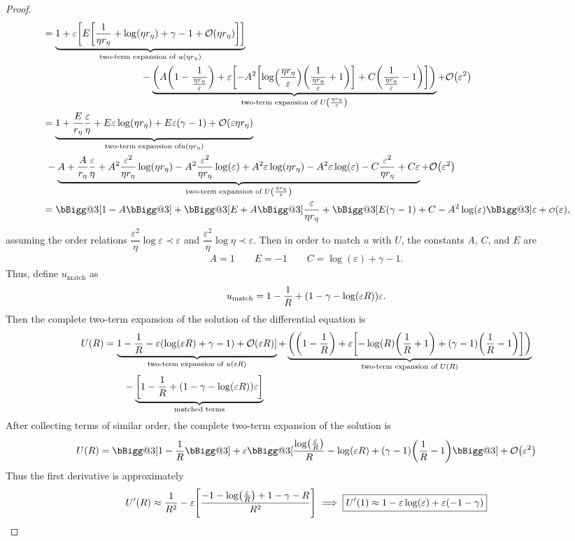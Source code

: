 \documentclass{article} %
\makeatletter
\theoremstyle{plain}
\newcommand{\BIGG}{\bBigg@{3}}
\newcommand{\E}{\varepsilon}
\newcommand{\littleo}[1]{\text{\scriptsize$\mathcal{O}$}\qty(#1)}
\numberwithin{equation}{section} %
\numberwithin{figure}{section} %
\numberwithin{table}{section} %
\makeatother
\begin{document}
\begin{proof}
\begin{align*}
        &= \underbrace{1 + \E\qty[E\qty[\frac{1}{\eta r_\eta} + \log(\eta r_\eta) + \gamma - 1 + \order{\eta r_\eta}]]}_{\text{two-term expansion of } u(\eta r_\eta)} \\
        &\qquad\qquad\qquad\qquad\qquad - \underbrace{\qty(A\qty(1 - \frac{1}{\frac{\eta r_\eta}{\E}}) + \E\qty[-A^2\qty[\log(\frac{\eta r_\eta}{\E})\qty(\dfrac{1}{\frac{\eta r_\eta}{\E}} + 1)] + C\qty(\dfrac{1}{\frac{\eta r_\eta}{\E}} - 1)])}_{\text{two-term expansion of } U\qty(\frac{\eta r_\eta}{\E})} + \order{\E^2} \\
        &= \underbrace{1 + \frac{E}{r_\eta}\frac{\E}{\eta} + E\E\log(\eta r_\eta) + E\E\qty(\gamma - 1) + \order{\E\eta r_\eta}}_{\text{two-term expansion of} u(\eta r_\eta)} \\
        &\ - \underbrace{A + \frac{A}{r_\eta}\frac{\E}{\eta} + A^2\frac{\E^2}{\eta r_\eta}\log(\eta r_\eta) - A^2\frac{\E^2}{\eta r_\eta}\log(\E) + A^2\E\log(\eta r_\eta) - A^2\E\log(\E) - C \frac{\E^2}{\eta r_\eta} + C\E}_{\text{two-term expansion of } U\qty(\frac{\eta r_\eta}{\E})} + \order{\E^2} \\
        &= \BIGG[1 - A\BIGG] + \BIGG[E + A\BIGG]\frac{\E}{\eta r_\eta} + \BIGG[E\qty(\gamma - 1) + C - A^2\log(\E)\BIGG]\E + \littleo{\E},
    \end{align*}
    assuming the order relations $\dfrac{\E^2}{\eta} \log\E \prec \E$ and $\dfrac{\E^2}{\eta} \log\eta \prec \E$.  Then in order to match $u$ with $U$, the constants $A$, $C$, and $E$ are
    \begin{align*}
        A = 1 \qquad E = -1 \qquad C = \log(\E) + \gamma - 1.
    \end{align*}
    Thus, define $u_\text{match}$ as
    \begin{align*}
        u_\text{match} = 1 - \frac{1}{R} + \qty(1 - \gamma - \log(\E R))\E.
    \end{align*}
    Then the complete two-term expansion of the solution of the differential equation is
    \begin{align*}
        U(R) &= \underbrace{1 - \frac{1}{R} - \E\qty(\log(\E R) + \gamma - 1) + \order{\E R}]}_{\text{two-term expansion of } u(\E R)} + \underbrace{\qty(\qty(1 - \frac{1}{R}) + \E\qty[-\log(R)\qty(\dfrac{1}{R} + 1) + \qty(\gamma - 1)\qty(\dfrac{1}{R} - 1)])}_{\text{two-term expansion of } U(R)} \\
        &\qquad - \underbrace{\qty[1 - \frac{1}{R} + \qty(1 - \gamma - \log(\E R))\E]}_{\text{matched terms}}
    \end{align*}
    After collecting terms of similar order, the complete two-term expansion of the solution is
    \begin{align*}
        U(R) = \BIGG[1 - \frac{1}{R}\BIGG] + \E\BIGG[\frac{\log(\frac{\E}{R})}{R} - \log(\E R) + \qty(\gamma - 1)\qty(\frac{1}{R} - 1)\BIGG] + \order{\E^2}
    \end{align*}
    Thus the first derivative is approximately
    \begin{align*}
        U'(R) \approx \frac{1}{R^2} - \E\qty[\frac{-1 - \log(\frac{\E}{R}) + 1 - \gamma - R}{R^2}] \implies \boxed{U'(1) \approx 1 - \E\log(\E)+ \E\qty(-1 - \gamma)}
    \end{align*}
\end{proof}
    
\end{document}
